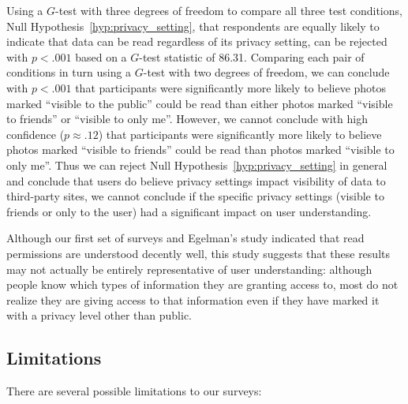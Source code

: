 \documentclass{sig-alternate}
\begin{document}
Using a $G$-test with three degrees of freedom to compare all three test conditions, Null Hypothesis~\ref{hyp:privacy_setting}, that respondents are equally likely to indicate that data can be read regardless of its privacy setting, can be rejected with $p < .001$ based on a $G$-test statistic of 86.31.
Comparing each pair of conditions in turn using a $G$-test with two degrees of freedom, we can conclude with $p < .001$ that participants were significantly more likely to believe photos marked ``visible to the public'' could be read than either photos marked ``visible to friends'' or ``visible to only me''.
However, we cannot conclude with high confidence ($p \approx .12$) that participants were significantly more likely to believe photos marked ``visible to friends'' could be read than photos marked ``visible to only me''.
Thus we can reject Null Hypothesis~\ref{hyp:privacy_setting} in general and conclude that users do believe privacy settings impact visibility of data to third-party sites, we cannot conclude if the specific privacy settings (visible to friends or only to the user) had a significant impact on user understanding.

Although our first set of surveys and Egelman's study \cite{egelman} indicated that read permissions are understood decently well, this study suggests that these results may not actually be entirely representative of user understanding: although people know which types of information they are granting access to, most do not realize they are giving access to that information even if they have marked it with a privacy level other than public.


\subsection{Limitations}
\label{sec:limitations}

There are several possible limitations to our surveys:
\end{document}
